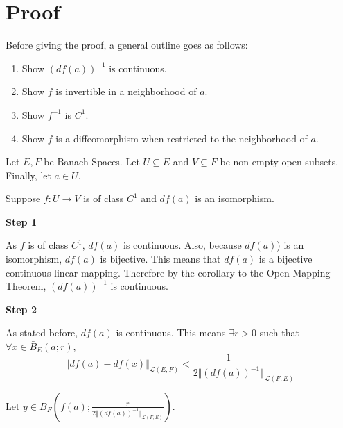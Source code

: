 \documentclass{article}
\begin{document}
\section{Proof}

Before giving the proof, a general outline goes as follows:
\begin{enumerate}
    \item Show \((df(a))^{-1}\) is continuous.
    \item Show \(f\) is invertible in a neighborhood of \(a\).
    \item Show \(f^{-1}\) is \(C^1\).
    \item Show \(f\) is a diffeomorphism when restricted to the neighborhood of \(a\).
\end{enumerate}

Let \(E,F\) be Banach Spaces.  Let \(U\subseteq E\) and \(V\subseteq F\) be non-empty open subsets.  Finally, let \(a\in U\).

Suppose \(f:U\to V\) is of class \(C^1\) and \(df(a)\) is an isomorphism.

\textbf{Step 1}

As \(f\) is of class \(C^1\), \(df(a)\) is continuous.  Also, because \(df(a)\)) is an isomorphism, \(df(a)\) is bijective.  This means that \(df(a)\) is a bijective continuous linear mapping.  Therefore by the corollary to the Open Mapping Theorem, \((df(a))^{-1}\) is continuous.

\textbf{Step 2}

As stated before, \(df(a)\) is continuous.  This means \(\exists r>0\) such that \(\forall x\in\bar{B}_E(a;r)\),
\[\Vert df(a)-df(x)\Vert_{\mathcal{L}(E,F)} < \frac{1}{2\Vert(df(a))^{-1}\Vert}_{\mathcal{L}(F,E)}\]

Let \(y\in B_F(f(a);\frac{r}{2\Vert(df(a))^{-1}\Vert_{\mathcal{L}(F,E)}})\).  
\end{document}
